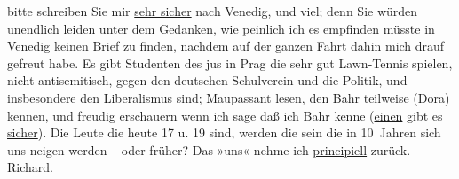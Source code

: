 \begin{ledgroupsized}[t]{13cm}
               bitte schreiben Sie mir \uline{sehr sicher} nach Venedig, und viel; denn Sie würden unendlich
               leiden unter dem Gedanken, wie peinlich ich es empfinden müsste in Venedig keinen Brief {\pb}zu finden, nachdem auf der ganzen
               Fahrt dahin mich drauf gefreut habe.\pend
           \pstart
           Es gibt Studenten des jus in Prag die sehr gut
               Lawn-Tennis spielen, nicht antisemitisch, gegen den deutschen Schulverein und die Politik, und insbesondere den Liberalismus
               sind; Maupassant lesen, den Bahr teilweise (Dora) kennen, und freudig erschauern wenn ich sage daß ich Bahr kenne (\uline{einen} gibt es \uline{sicher}). Die Leute die heute
               17 u. 19 sind, werden die sein die in 10 Jahren sich uns neigen werden – oder früher?
               Das »uns« nehme ich \uline{principiell} zurück.
                  \spacefill\mbox{Richard.}\pend
           
         
         \endnumbering{}\end{ledgroupsized}  \newcommand{\dateiname}{L00388}\newcommand{\titel}{Richard Beer-Hofmann an Arthur Schnitzler, 20. 10. 1894}\newcommand{\editorInnen}{ Martin Anton Müller und Gerd-Hermann Susen}
      